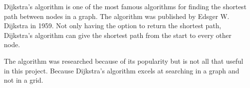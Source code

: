 Dijkstra's algorithm is one of the most famous algorithms for finding the shortest path between nodes in a graph. The algorithm was published by Edsger W. Dijkstra in 1959. Not only having the option to return the shortest path, Dijkstra's algorithm can give the shortest path from the start to every other node.

The algorithm was researched because of its popularity but is not all that useful in this project. Because Dijkstra's algorithm excels at searching in a graph and not in a grid.